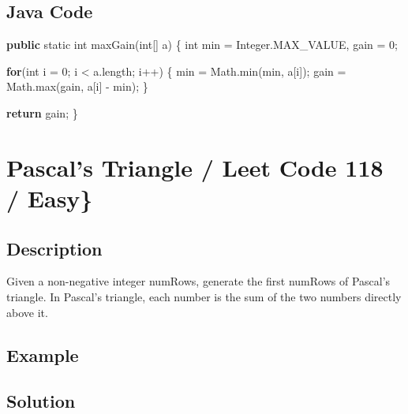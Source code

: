 \documentclass[]{book}
\newenvironment{Shaded}{\begin{snugshade}}{\end{snugshade}}
\newcommand{\BuiltInTok}[1]{#1}
\newcommand{\DataTypeTok}[1]{\textcolor[rgb]{0.13,0.29,0.53}{#1}}
\newcommand{\DecValTok}[1]{\textcolor[rgb]{0.00,0.00,0.81}{#1}}
\newcommand{\FunctionTok}[1]{\textcolor[rgb]{0.00,0.00,0.00}{#1}}
\newcommand{\KeywordTok}[1]{\textcolor[rgb]{0.13,0.29,0.53}{\textbf{#1}}}
\newcommand{\NormalTok}[1]{#1}
\begin{document}
\hypertarget{java-code-7}{%
\subsection{Java Code}\label{java-code-7}}

\begin{Shaded}
\begin{Highlighting}[]
\KeywordTok{public} \DataTypeTok{static} \DataTypeTok{int} \FunctionTok{maxGain}\NormalTok{(}\DataTypeTok{int}\NormalTok{[] a) \{}
    \DataTypeTok{int}\NormalTok{ min = }\BuiltInTok{Integer}\NormalTok{.}\FunctionTok{MAX_VALUE}\NormalTok{, gain = }\DecValTok{0}\NormalTok{;}

    \KeywordTok{for}\NormalTok{(}\DataTypeTok{int}\NormalTok{ i = }\DecValTok{0}\NormalTok{; i < a.}\FunctionTok{length}\NormalTok{; i++) \{}
\NormalTok{        min = }\BuiltInTok{Math}\NormalTok{.}\FunctionTok{min}\NormalTok{(min, a[i]);}
\NormalTok{        gain = }\BuiltInTok{Math}\NormalTok{.}\FunctionTok{max}\NormalTok{(gain, a[i] - min);}
\NormalTok{    \}}

    \KeywordTok{return}\NormalTok{ gain;}
\NormalTok{\}}
\end{Highlighting}
\end{Shaded}

\hypertarget{pascals-triangle-leet-code-118-easy}{%
\section{Pascal's Triangle / Leet Code 118 / Easy\}}\label{pascals-triangle-leet-code-118-easy}}

\hypertarget{description-9}{%
\subsection{Description}\label{description-9}}

Given a non-negative integer numRows, generate the first numRows of Pascal's triangle. In Pascal's triangle, each
number is the sum of the two numbers directly above it.

\hypertarget{example-8}{%
\subsection{Example}\label{example-8}}

\hypertarget{solution-7}{%
\subsection{Solution}\label{solution-7}}
\end{document}
